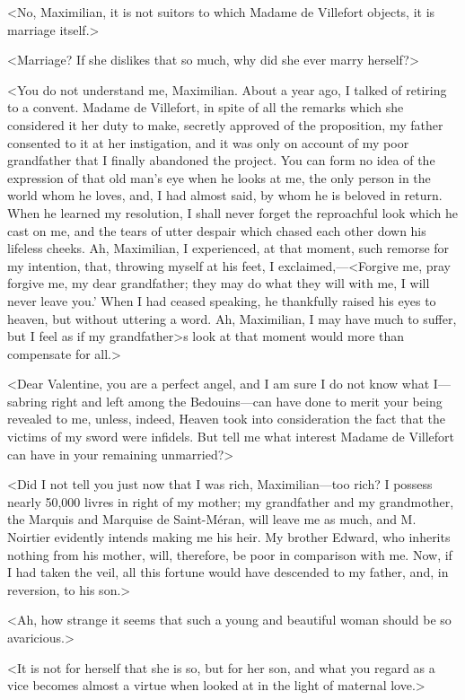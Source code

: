  <No, Maximilian, it is not suitors to which Madame de Villefort objects, it is marriage itself.> 

 <Marriage? If she dislikes that so much, why did she ever marry herself?> 

 <You do not understand me, Maximilian. About a year ago, I talked of retiring to a convent. Madame de Villefort, in spite of all the remarks which she considered it her duty to make, secretly approved of the proposition, my father consented to it at her instigation, and it was only on account of my poor grandfather that I finally abandoned the project. You can form no idea of the expression of that old man's eye when he looks at me, the only person in the world whom he loves, and, I had almost said, by whom he is beloved in return. When he learned my resolution, I shall never forget the reproachful look which he cast on me, and the tears of utter despair which chased each other down his lifeless cheeks. Ah, Maximilian, I experienced, at that moment, such remorse for my intention, that, throwing myself at his feet, I exclaimed,—<Forgive me, pray forgive me, my dear grandfather; they may do what they will with me, I will never leave you.' When I had ceased speaking, he thankfully raised his eyes to heaven, but without uttering a word. Ah, Maximilian, I may have much to suffer, but I feel as if my grandfather>s look at that moment would more than compensate for all.> 

 <Dear Valentine, you are a perfect angel, and I am sure I do not know what I—sabring right and left among the Bedouins—can have done to merit your being revealed to me, unless, indeed, Heaven took into consideration the fact that the victims of my sword were infidels. But tell me what interest Madame de Villefort can have in your remaining unmarried?> 

 <Did I not tell you just now that I was rich, Maximilian—too rich? I possess nearly 50,000 livres in right of my mother; my grandfather and my grandmother, the Marquis and Marquise de Saint-Méran, will leave me as much, and M. Noirtier evidently intends making me his heir. My brother Edward, who inherits nothing from his mother, will, therefore, be poor in comparison with me. Now, if I had taken the veil, all this fortune would have descended to my father, and, in reversion, to his son.> 

 <Ah, how strange it seems that such a young and beautiful woman should be so avaricious.> 

 <It is not for herself that she is so, but for her son, and what you regard as a vice becomes almost a virtue when looked at in the light of maternal love.> 

